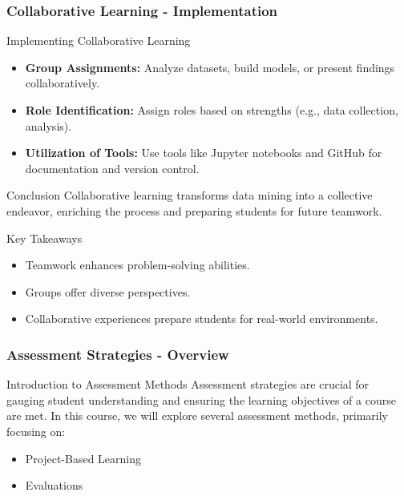 \documentclass[aspectratio=169]{beamer}
\begin{document}
\begin{frame}[fragile]
    \frametitle{Collaborative Learning - Implementation}
    \begin{block}{Implementing Collaborative Learning}
        \begin{itemize}
            \item \textbf{Group Assignments:} Analyze datasets, build models, or present findings collaboratively.
            \item \textbf{Role Identification:} Assign roles based on strengths (e.g., data collection, analysis).
            \item \textbf{Utilization of Tools:} Use tools like Jupyter notebooks and GitHub for documentation and version control.
        \end{itemize}
    \end{block}
    
    \begin{block}{Conclusion}
        Collaborative learning transforms data mining into a collective endeavor, enriching the process and preparing students for future teamwork.
    \end{block}
    
    \begin{block}{Key Takeaways}
        \begin{itemize}
            \item Teamwork enhances problem-solving abilities.
            \item Groups offer diverse perspectives.
            \item Collaborative experiences prepare students for real-world environments.
        \end{itemize}
    \end{block}
\end{frame}

\begin{frame}[fragile]
    \frametitle{Assessment Strategies - Overview}
    \begin{block}{Introduction to Assessment Methods}
        Assessment strategies are crucial for gauging student understanding and ensuring the learning objectives of a course are met. In this course, we will explore several assessment methods, primarily focusing on:
        \begin{itemize}
            \item Project-Based Learning
            \item Evaluations
        \end{itemize}
    \end{block}
\end{frame}
\end{document}
